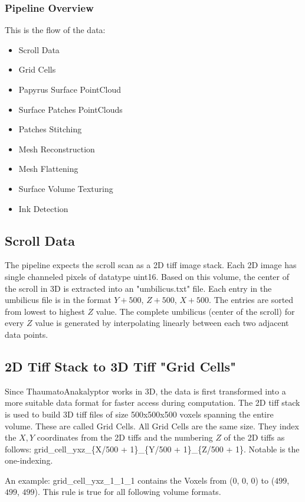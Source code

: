 \documentclass[peerreview]{IEEEtran}
\begin{document}
\subsubsection{Pipeline Overview}
This is the flow of the data:
\begin{itemize}
    \item Scroll Data
    \item Grid Cells
    \item Papyrus Surface PointCloud
    \item Surface Patches PointClouds
    \item Patches Stitching
    \item Mesh Reconstruction
    \item Mesh Flattening
    \item Surface Volume Texturing
    \item Ink Detection
\end{itemize}



\subsection{Scroll Data}
The pipeline expects the scroll scan as a 2D tiff image stack. Each 2D image has single channeled pixels of datatype uint16. Based on this volume, the center of the scroll in 3D is extracted into an "umbilicus.txt" file.
Each entry in the umbilicus file is in the format $Y + 500$, $Z + 500$, $X + 500$. The entries are sorted from lowest to highest $Z$ value. The complete umbilicus (center of the scroll) for every $Z$ value is generated by interpolating linearly between each two adjacent data points.

\subsection{2D Tiff Stack to 3D Tiff "Grid Cells"}
Since ThaumatoAnakalyptor works in 3D, the data is first transformed into a more suitable data format for faster access during computation.
The 2D tiff stack is used to build 3D tiff files of size 500x500x500 voxels spanning the entire volume. These are called Grid Cells. All Grid Cells are the same size. They index the $X,Y$ coordinates from the 2D tiffs and the numbering $Z$ of the 2D tiffs as follows: grid\_cell\_yxz\_\{X/500 + 1\}\_\{Y/500 + 1\}\_\{Z/500 + 1\}. Notable is the one-indexing. 

An example: grid\_cell\_yxz\_1\_1\_1 contains the Voxels from ($0$, $0$, $0$) to ($499$, $499$, $499$). This rule is true for all following volume formats.
\end{document}
